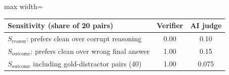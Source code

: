 \begin{adjustbox}{max width=\linewidth}
\begin{tabular}{lcc}
\toprule
Sensitivity (share of 20 pairs) & Verifier & AI judge \\
\midrule
$S_{\mathrm{reason}}$: prefers clean over corrupt reasoning & 0.00 & 0.10 \\
$S_{\mathrm{outcome}}$: prefers clean over wrong final answer & 1.00 & 0.15 \\
$S_{\mathrm{outcome}}$ including gold-distractor pairs (40) & 1.00 & 0.075 \\
\bottomrule
\end{tabular}
\end{adjustbox}

